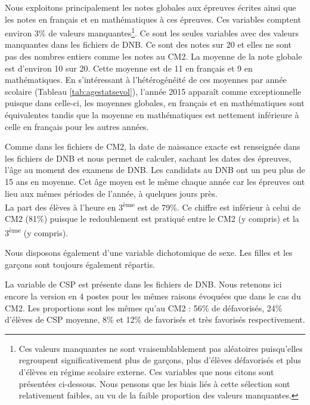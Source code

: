 \documentclass[
]{book}
\begin{document}
\quad Nous exploitons principalement les notes globales aux épreuves écrites ainsi que les notes en français et en mathématiques à ces épreuves. Ces variables comptent environ 3\% de valeurs manquantes\footnote{Ces valeurs manquantes ne sont vraisemblablement pas aléatoires puisqu'elles regroupent significativement plus de garçons, plus d'élèves défavorisés et plus d'élèves en régime scolaire externe. Ces variables que nous citons sont présentées ci-dessous. Nous pensons que les biais liés à cette sélection sont relativement faibles, au vu de la faible proportion des valeurs manquantes.}. Ce sont les seules variables avec des valeurs manquantes dans les fichiers de DNB. Ce sont des notes sur 20 et elles ne sont pas des nombres entiers comme les notes au CM2. La moyenne de la note globale est d'environ 10 sur 20. Cette moyenne est de 11 en français et 9 en mathématiques. En s'intéressant à l'hétérogénéité de ces moyennes par année scolaire (Tableau \ref{tab:agestatsevol}), l'année 2015 apparaît comme exceptionnelle puisque dans celle-ci, les moyennes globales, en français et en mathématiques sont équivalentes tandis que la moyenne en mathématiques est nettement inférieure à celle en français pour les autres années.

\quad Comme dans les fichiers de CM2, la date de naissance exacte est renseignée dans les fichiers de DNB et nous permet de calculer, sachant les dates des épreuves, l'âge au moment des examens de DNB. Les candidats au DNB ont un peu plus de 15 ans en moyenne. Cet âge moyen est le même chaque année car les épreuves ont lieu aux mêmes périodes de l'année, à quelques jours près.\\
La part des élèves à l'heure en 3\textsuperscript{ème} est de 79\%. Ce chiffre est inférieur à celui de CM2 (81\%) puisque le redoublement est pratiqué entre le CM2 (y compris) et la 3\textsuperscript{ème} (y compris).

\quad Nous disposons également d'une variable dichotomique de sexe. Les filles et les garçons sont toujours également répartis.

\quad La variable de CSP est présente dans les fichiers de DNB. Nous retenons ici encore la version en 4 postes pour les mêmes raisons évoquées que dans le cas du CM2. Les proportions sont les mêmes qu'au CM2 : 56\% de défavorisés, 24\% d'élèves de CSP moyenne, 8\% et 12\% de favorisés et très favorisés respectivement.
\end{document}
